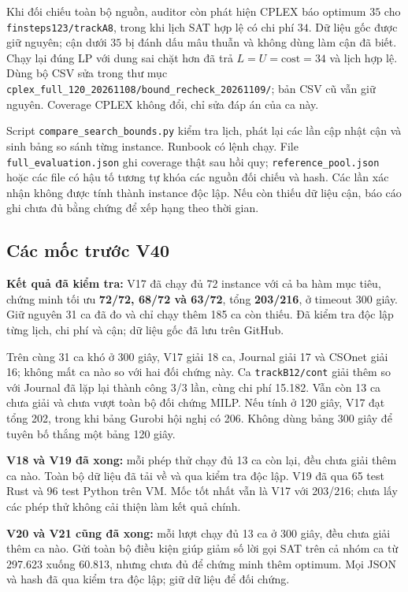 \documentclass[11pt,a4paper]{article}
\newcommand{\code}[1]{\texttt{#1}}
\newcommand{\file}[1]{\nolinkurl{#1}}
\begin{document}
Khi đối chiếu toàn bộ nguồn, auditor còn phát hiện CPLEX báo optimum
$35$ cho \code{finsteps123/trackA8}, trong khi lịch SAT hợp lệ có chi phí
$34$. Dữ liệu gốc được giữ nguyên; cận dưới $35$ bị đánh dấu mâu thuẫn
và không dùng làm cận đã biết. Chạy lại đúng LP với dung sai chặt hơn đã
trả $L=U=\mathrm{cost}=34$ và lịch hợp lệ. Dùng bộ CSV sửa trong thư mục
\file{cplex\_full\_120\_20261108/bound\_recheck\_20261109/}; bản CSV cũ
vẫn giữ nguyên. Coverage CPLEX không đổi, chỉ sửa đáp án của ca này.

Script \file{compare\_search\_bounds.py} kiểm tra lịch, phát lại các lần
cập nhật cận và sinh bảng so sánh từng instance. Runbook có lệnh chạy.
File \file{full\_evaluation.json} ghi coverage thật sau hồi quy;
\file{reference\_pool.json} hoặc các file có hậu tố tương tự khóa các
nguồn đối chiếu và hash. Các lần xác nhận không được tính thành instance
độc lập. Nếu còn thiếu dữ liệu cận, báo cáo ghi chưa đủ bằng chứng để
xếp hạng theo thời gian.

\subsection{Các mốc trước V40}

\textbf{Kết quả đã kiểm tra:} V17 đã chạy đủ 72 instance với cả ba hàm mục
tiêu, chứng minh tối ưu \textbf{72/72, 68/72 và 63/72}, tổng
\textbf{203/216}, ở timeout 300 giây. Giữ nguyên 31 ca đã đo và chỉ chạy
thêm 185 ca còn thiếu. Đã kiểm tra độc lập từng lịch, chi phí và cận;
dữ liệu gốc đã lưu trên GitHub.

Trên cùng 31 ca khó ở 300 giây, V17 giải 18 ca, Journal giải 17 và CSOnet
giải 16; không mất ca nào so với hai đối chứng này. Ca \code{trackB12/cont} giải thêm so với Journal đã lặp lại thành công
3/3 lần, cùng chi phí 15.182. Vẫn còn 13 ca chưa giải và chưa vượt toàn bộ
đối chứng MILP. Nếu tính ở 120 giây, V17 đạt tổng
202, trong khi bảng Gurobi hội nghị có 206. Không dùng bảng 300 giây để
tuyên bố thắng một bảng 120 giây.

\textbf{V18 và V19 đã xong:} mỗi phép thử chạy đủ 13 ca còn lại, đều
chưa giải thêm ca nào. Toàn bộ dữ liệu đã tải về và qua kiểm tra độc lập.
V19 đã qua 65 test Rust và 96 test Python trên VM. Mốc tốt nhất vẫn là
V17 với 203/216; chưa lấy các phép thử không cải thiện làm kết quả chính.

\textbf{V20 và V21 cũng đã xong:} mỗi lượt chạy đủ 13 ca ở 300 giây,
đều chưa giải thêm ca nào. Gửi toàn bộ điều kiện giúp giảm số lời gọi SAT
trên cả nhóm ca từ 297.623 xuống 60.813, nhưng chưa đủ để chứng minh thêm
optimum. Mọi JSON và hash đã qua kiểm tra độc lập; giữ dữ liệu để đối chứng.
\end{document}
